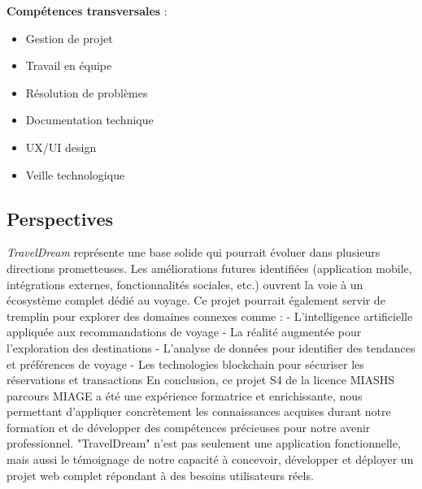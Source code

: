 \documentclass[a4paper,12pt]{article}
\begin{document}
\textbf{Compétences transversales} :
\begin{itemize}
  \item Gestion de projet
  \item Travail en équipe
  \item Résolution de problèmes
  \item Documentation technique
  \item UX/UI design
  \item Veille technologique
\end{itemize}



\subsection{Perspectives}
\textit{TravelDream}  représente une base solide qui pourrait évoluer dans plusieurs directions
prometteuses. Les améliorations futures identifiées (application mobile, intégrations
externes, fonctionnalités sociales, etc.) ouvrent la voie à un écosystème complet dédié
au voyage.
Ce projet pourrait également servir de tremplin pour explorer des domaines connexes
comme : - L'intelligence artificielle appliquée aux recommandations de voyage - La
réalité augmentée pour l'exploration des destinations - L'analyse de données pour
identifier des tendances et préférences de voyage - Les technologies blockchain pour
sécuriser les réservations et transactions
En conclusion, ce projet S4 de la licence MIASHS parcours MIAGE a été une expérience
formatrice et enrichissante, nous permettant d'appliquer concrètement les
connaissances acquises durant notre formation et de développer des compétences
précieuses pour notre avenir professionnel. "TravelDream" n'est pas seulement une
application fonctionnelle, mais aussi le témoignage de notre capacité à concevoir,
développer et déployer un projet web complet répondant à des besoins utilisateurs
réels.
\end{document}
